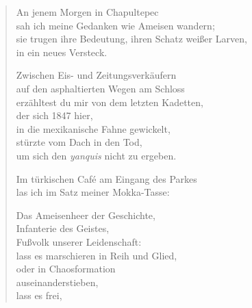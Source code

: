 
\cleartoverso



\begin{verse}

An jenem Morgen in Chapultepec\\
sah ich meine Gedanken wie Ameisen wandern;\\
sie trugen ihre Bedeutung, ihren Schatz weißer Larven,\\
in ein neues Versteck.

Zwischen Eis- und Zeitungsverkäufern\\
auf den asphaltierten Wegen am Schloss\\
erzähltest du mir von dem letzten Kadetten,\\
der sich 1847 hier,\\
in die mexikanische Fahne gewickelt,\\
stürzte vom Dach in den Tod,\\
um sich den \emph{yanquis} nicht zu ergeben.

Im türkischen Café am Eingang des Parkes\\
las ich im Satz meiner Mokka-Tasse:

Das Ameisenheer der Geschichte,\\
Infanterie des Geistes,\\
Fußvolk unserer Leidenschaft:\\
lass es marschieren in Reih und Glied,\\
oder in Chaosformation\\
auseinanderstieben,\\
lass es frei,
\end{verse}

\clearpage



